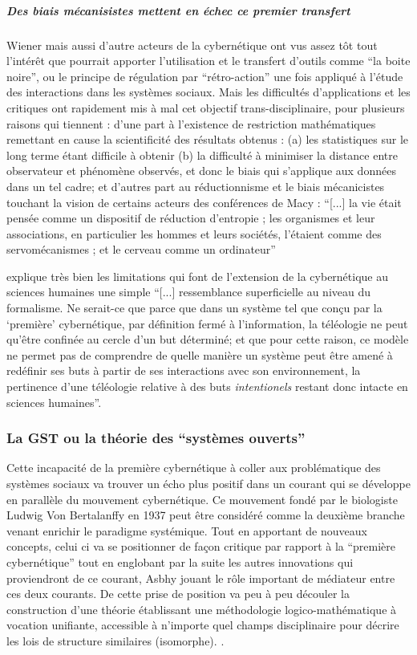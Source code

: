 \subparagraph{Des biais mécanisistes mettent en échec ce premier transfert}

Wiener mais aussi d'autre acteurs de la cybernétique ont vus assez tôt tout l'intérêt que pourrait apporter l'utilisation et le transfert d'outils comme \enquote{la boite noire}, ou le principe de régulation par \enquote{rétro-action} une fois appliqué à l'étude des interactions dans les systèmes sociaux. Mais les difficultés d'applications et les critiques ont rapidement mis à mal cet objectif trans-disciplinaire, pour plusieurs raisons qui tiennent : d'une part à l'existence de restriction mathématiques remettant en cause la scientificité des résultats obtenus : (a) les statistiques sur le long terme étant difficile à obtenir (b) la difficulté à minimiser la distance entre observateur et phénomène observés, et donc le biais qui s'applique aux données dans un tel cadre; et d'autres part au réductionnisme et le biais mécanicistes touchant la vision de certains acteurs des conférences de Macy  : \enquote{[...] la vie était pensée comme un dispositif de réduction d'entropie ; les organismes et leur associations, en particulier les hommes et leurs sociétés, l'étaient comme des servomécanismes ; et le cerveau comme un ordinateur} \autocite[784]{Pouvreau2013}

\autocite[782]{Pouvreau2013} explique très bien les limitations qui font  de l'extension de la cybernétique au sciences humaines une simple \enquote{[...] ressemblance superficielle au niveau du formalisme. Ne serait-ce que parce que dans un système tel que conçu par la \enquote{première} cybernétique, par définition fermé à l'information, la téléologie ne peut qu'être confinée au cercle d'un but déterminé; et que pour cette raison, ce modèle ne permet pas de comprendre de quelle manière un système peut être amené à redéfinir ses buts à partir de ses interactions avec son environnement, la pertinence d'une téléologie relative à des buts \textit{intentionels} restant donc intacte en sciences humaines}.

\subsubsection{La GST ou la théorie des \enquote{systèmes ouverts}}
\label{ssubsec:gst}

Cette incapacité de la première cybernétique à coller aux problématique des systèmes sociaux va trouver un écho plus positif dans un courant qui se développe en parallèle du mouvement cybernétique. Ce mouvement fondé par le biologiste Ludwig Von Bertalanffy en 1937 peut être considéré comme la deuxième branche venant enrichir le paradigme systémique. Tout en apportant de nouveaux concepts, celui ci va se positionner de façon critique par rapport à la \enquote{première cybernétique} tout en englobant par la suite les autres innovations qui proviendront de ce courant, Asbhy jouant le rôle important de médiateur entre ces deux courants.\autocite[]{Pouvreau2013} De cette prise de position va peu à peu découler la construction d'une théorie établissant une méthodologie logico-mathématique à vocation unifiante, accessible à n'importe quel champs disciplinaire pour décrire les lois de structure similaires (isomorphe). \autocite{LeMoigne2006a}. 

